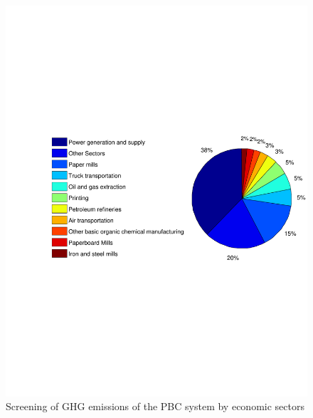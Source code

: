 \documentclass[3p,times,procedia]{elsarticle}
\begin{document}
\begin{figure}[t]
\includegraphics[width=\linewidth]{f.pdf}
\caption{Screening of GHG emissions of the PBC system by economic sectors}
\label{screecn3Sectors}
\endminipage\hfill
{}

\end{figure}
\end{document}
